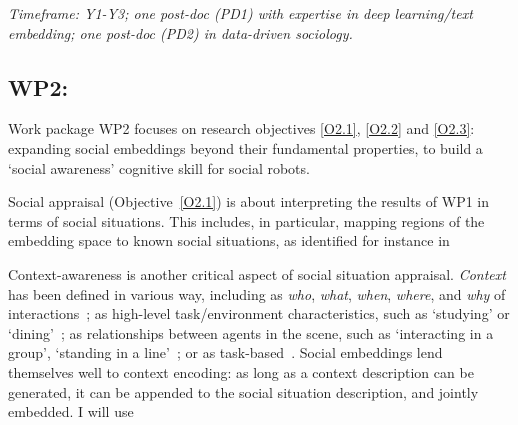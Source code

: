 \vspace{1em}
\noindent\emph{ Timeframe: Y1-Y3; one post-doc (PD1) with expertise in
    deep learning/text embedding; one post-doc (PD2) in data-driven sociology.}


\subsection{WP2: \textbf{\WPB}} 

Work package WP2 focuses on research objectives \ref{O2.1}, \ref{O2.2} and \ref{O2.3}:
expanding social embeddings beyond their fundamental properties, to build a
`social awareness' cognitive skill for social robots.





Social appraisal (Objective~\ref{O2.1}) is about interpreting the results of WP1
in terms of social situations. This includes, in particular, mapping regions of
the embedding space to known social situations, as identified for instance in~\cite{kelley2003atlas}  

Context-awareness is another critical aspect of social situation appraisal.
\emph{Context} has been defined in various way, including as \emph{who},
\emph{what}, \emph{when}, \emph{where}, and \emph{why} of
interactions~\cite{vinciarelli2009social}; as high-level task/environment
characteristics, such as `studying' or `dining'~\cite{nigam2015social}; as
relationships between agents in the scene, such as `interacting in a group',
`standing in a line'~\cite{althaus2004navigation}; or as
task-based~\cite{castellano2012detecting}. Social embeddings lend themselves
well to context encoding: as long as a context description can be generated, it
can be appended to the social situation description, and jointly embedded.
I will use 
%

